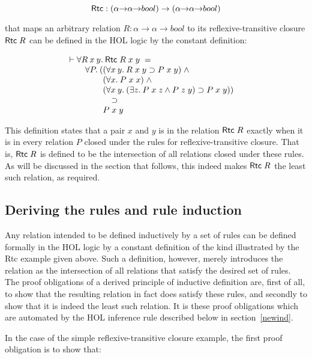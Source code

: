 \[ {\sf Rtc} : (\alpha{\rightarrow}\alpha{\rightarrow}bool) \rightarrow
(\alpha{\rightarrow}\alpha{\rightarrow}bool) \]

\noindent that maps an arbitrary relation $R :
\alpha{\rightarrow}\alpha{\rightarrow}bool$ to its reflexive-transitive closure
${\sf Rtc}\;R$ can be defined in the {\small HOL} logic by the constant
definition:

\[\vdash \begin{array}[t]{@{}l}
\forall R\:x\:y.\:{\sf Rtc}\;R\;x\;y\;= \\
\quad\forall P.\:(\begin{array}[t]{@{}l}
  (\forall x\: y.\:R\;x\;y \supset P\;x\;y)\; \wedge \\
  (\forall x.\:P\;x\;x)\; \wedge \\
  (\forall x\: y.\:(\exists z.\:P\;x\;z \wedge P\;z\;y) \supset P\;x\;y)) \\
\quad\supset\\
P\;x\;y
\end{array}\end{array}\]

\noindent This definition states that a pair $x$ and $y$ is in the relation
${\sf Rtc}\;R$ exactly when it is in every relation $P$ closed under the rules
for reflexive-transitive closure. That is, ${\sf Rtc}\;R$ is \mbox{defined} to
be the intersection of all relations closed under these rules.  As will be
discussed in the section that follows, this indeed makes ${\sf Rtc}\;R$ the
least such relation, as required.


\subsection{Deriving the rules and rule induction}

Any relation intended to be defined inductively by a set of rules can be
defined formally in the {\small HOL} logic by a constant definition of the kind
illustrated by the {\sf Rtc} example given above.  Such a definition, however,
merely introduces the relation as the intersection of all relations that
satisfy the desired set of rules.  The proof obligations of a derived principle
of inductive definition are, first of all, to show that the resulting relation
in fact does satisfy these rules, and secondly to show that it is indeed the
least such relation.  It is these proof obligations which are automated by the
{\small HOL} inference rule described below in section~\ref{newind}.

In the case of the simple reflexive-transitive closure example, the first proof
obligation is to show that:

